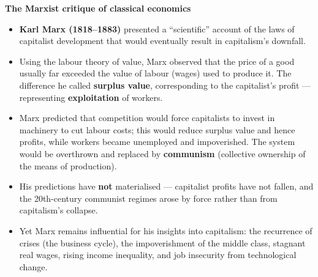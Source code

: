 \textbf{The Marxist critique of classical economics}
\begin{itemize}
  \item \textbf{Karl Marx (1818--1883)} presented a ``scientific'' account of the laws of capitalist development that would eventually result in capitalism's downfall.
  \item Using the labour theory of value, Marx observed that the price of a good usually far exceeded the value of labour (wages) used to produce it. The difference he called \textbf{surplus value}, corresponding to the capitalist's profit --- representing \textbf{exploitation} of workers.
  \item Marx predicted that competition would force capitalists to invest in machinery to cut labour costs; this would reduce surplus value and hence profits, while workers became unemployed and impoverished. The system would be overthrown and replaced by \textbf{communism} (collective ownership of the means of production).
  \item His predictions have \textbf{not} materialised --- capitalist profits have not fallen, and the 20th-century communist regimes arose by force rather than from capitalism's collapse.
  \item Yet Marx remains influential for his insights into capitalism: the recurrence of crises (the business cycle), the impoverishment of the middle class, stagnant real wages, rising income inequality, and job insecurity from technological change.
\end{itemize}
